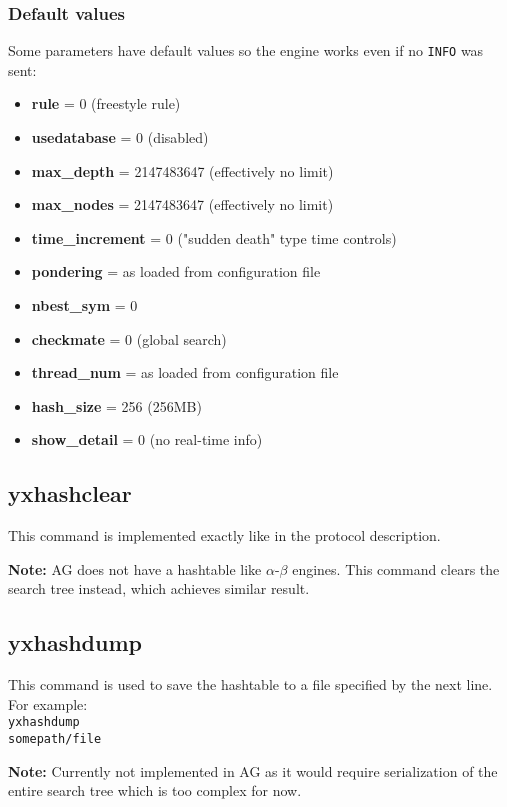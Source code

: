 \documentclass[12pt,a4paper]{article}
\begin{document}
\subsubsection{Default values}
Some parameters have default values so the engine works even if no \texttt{INFO} was sent:
\begin{itemize}
\item{\textbf{rule} = 0 (freestyle rule)}
\item{\textbf{usedatabase} = 0 (disabled)}
\item{\textbf{max{\_}depth } = 2147483647 (effectively no limit)}
\item{\textbf{max{\_}nodes} = 2147483647 (effectively no limit)}
\item{\textbf{time{\_}increment} = 0 ("sudden death" \cite{suddendeath} type time controls)}
\item{\textbf{pondering} = as loaded from configuration file}
\item{\textbf{nbest{\_}sym} = 0}
\item{\textbf{checkmate} = 0 (global search)}
\item{\textbf{thread{\_}num} = as loaded from configuration file}
\item{\textbf{hash{\_}size} = 256 (256MB)}
\item{\textbf{show{\_}detail} = 0 (no real-time info)}
\end{itemize}

\subsection{yxhashclear}
This command is implemented exactly like in the protocol description.

\textbf{Note:} AG does not have a hashtable like $\alpha$-$\beta$ engines. This command clears the search tree instead, which achieves similar result.

\subsection{yxhashdump}
This command is used to save the hashtable to a file specified by the next line. For example:
\\
\texttt{yxhashdump}\\
\texttt{somepath/file}

\textbf{Note:} Currently not implemented in AG as it would require serialization of the entire search tree which is too complex for now.
\end{document}
